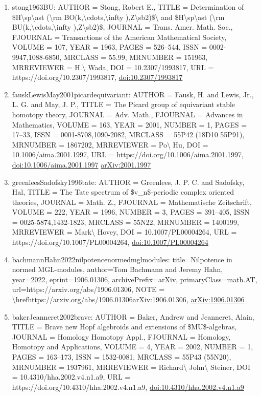 \documentclass[11pt]{article}
\begin{document}
\begin{enumerate}[leftmargin=*]
  \item stong1963BU: AUTHOR = Stong, Robert E., TITLE = Determination of \$H\textbackslash{}sp\textbackslash{}ast (\textbackslash{}rm BO(k,\textbackslash{}cdots,\textbackslash{}infty ),Z\textbackslash{}sb2)\$\textbackslash{} and \$H\textbackslash{}sp\textbackslash{}ast (\textbackslash{}rm BU(k,\textbackslash{}cdots,\textbackslash{}infty ),Z\textbackslash{}sb2)\$, JOURNAL = Trans. Amer. Math. Soc., FJOURNAL = Transactions of the American Mathematical Society, VOLUME = 107, YEAR = 1963, PAGES = 526--544, ISSN = 0002-9947,1088-6850, MRCLASS = 55.99, MRNUMBER = 151963, MRREVIEWER = H.\textbackslash{} Wada, DOI = 10.2307/1993817, URL = https://doi.org/10.2307/1993817, \href{https://doi.org/10.2307/1993817}{doi:10.2307/1993817}
  \item fauskLewisMay2001picardequivariant: AUTHOR = Fausk, H. and Lewis, Jr., L. G. and May, J. P., TITLE = The Picard group of equivariant stable homotopy theory, JOURNAL = Adv. Math., FJOURNAL = Advances in Mathematics, VOLUME = 163, YEAR = 2001, NUMBER = 1, PAGES = 17--33, ISSN = 0001-8708,1090-2082, MRCLASS = 55P42 (18D10 55P91), MRNUMBER = 1867202, MRREVIEWER = Po\textbackslash{} Hu, DOI = 10.1006/aima.2001.1997, URL = https://doi.org/10.1006/aima.2001.1997, \href{https://doi.org/10.1006/aima.2001.1997}{doi:10.1006/aima.2001.1997} \href{https://arxiv.org/abs/2001.1997}{arXiv:2001.1997}
  \item greenleesSadofsky1996tate: AUTHOR = Greenlees, J. P. C. and Sadofsky, Hal, TITLE = The Tate spectrum of \$v\_n\$-periodic complex oriented theories, JOURNAL = Math. Z., FJOURNAL = Mathematische Zeitschrift, VOLUME = 222, YEAR = 1996, NUMBER = 3, PAGES = 391--405, ISSN = 0025-5874,1432-1823, MRCLASS = 55N22, MRNUMBER = 1400199, MRREVIEWER = Mark\textbackslash{} Hovey, DOI = 10.1007/PL00004264, URL = https://doi.org/10.1007/PL00004264, \href{https://doi.org/10.1007/PL00004264}{doi:10.1007/PL00004264}
  \item bachmannHahn2022nilpotencenormedmglmodules: title=Nilpotence in normed MGL-modules, author=Tom Bachmann and Jeremy Hahn, year=2022, eprint=1906.01306, archivePrefix=arXiv, primaryClass=math.AT, url=https://arxiv.org/abs/1906.01306, NOTE = \textbackslash{}hrefhttps://arxiv.org/abs/1906.01306arXiv:1906.01306, \href{https://arxiv.org/abs/1906.01306}{arXiv:1906.01306}
  \item bakerJeanneret2002brave: AUTHOR = Baker, Andrew and Jeanneret, Alain, TITLE = Brave new Hopf algebroids and extensions of \$MU\$-algebras, JOURNAL = Homology Homotopy Appl., FJOURNAL = Homology, Homotopy and Applications, VOLUME = 4, YEAR = 2002, NUMBER = 1, PAGES = 163--173, ISSN = 1532-0081, MRCLASS = 55P43 (55N20), MRNUMBER = 1937961, MRREVIEWER = Richard\textbackslash{} John\textbackslash{} Steiner, DOI = 10.4310/hha.2002.v4.n1.a9, URL = https://doi.org/10.4310/hha.2002.v4.n1.a9, \href{https://doi.org/10.4310/hha.2002.v4.n1.a9}{doi:10.4310/hha.2002.v4.n1.a9}

\end{enumerate}
\end{document}
